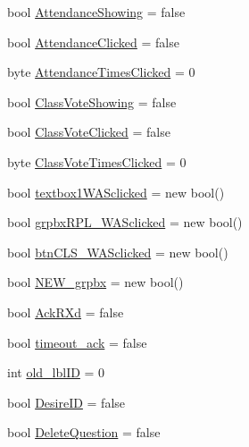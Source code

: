 \begin{DoxyCompactItemize}
\item 
bool \hyperlink{class_sr_p___classroom_inq_1_1frm_classrrom_inq_a24415681575df1fd435d1b1da60dfde3}{\-Attendance\-Showing} = false
\item 
bool \hyperlink{class_sr_p___classroom_inq_1_1frm_classrrom_inq_a319172bf9b9e58ec37499658a5289284}{\-Attendance\-Clicked} = false
\item 
byte \hyperlink{class_sr_p___classroom_inq_1_1frm_classrrom_inq_ade18c1a241b76944c2731681e1767652}{\-Attendance\-Times\-Clicked} = 0
\item 
bool \hyperlink{class_sr_p___classroom_inq_1_1frm_classrrom_inq_ae23aa3324c19688aa8d35b0217cf9605}{\-Class\-Vote\-Showing} = false
\item 
bool \hyperlink{class_sr_p___classroom_inq_1_1frm_classrrom_inq_a1e2c8341b4d2988c61648bea9a4c412b}{\-Class\-Vote\-Clicked} = false
\item 
byte \hyperlink{class_sr_p___classroom_inq_1_1frm_classrrom_inq_ab63c943c019363dba6aa86686b9f2bf6}{\-Class\-Vote\-Times\-Clicked} = 0
\item 
bool \hyperlink{class_sr_p___classroom_inq_1_1frm_classrrom_inq_a998e499144884577e3445f4b721b4c6a}{textbox1\-W\-A\-Sclicked} = new bool()
\item 
bool \hyperlink{class_sr_p___classroom_inq_1_1frm_classrrom_inq_a97ab9f8512cd6b2f9648651d5c5d404b}{grpbx\-R\-P\-L\-\_\-\-W\-A\-Sclicked} = new bool()
\item 
bool \hyperlink{class_sr_p___classroom_inq_1_1frm_classrrom_inq_aed9d1ad7c4e2b196997c1820ac2cdb4d}{btn\-C\-L\-S\-\_\-\-W\-A\-Sclicked} = new bool()
\item 
bool \hyperlink{class_sr_p___classroom_inq_1_1frm_classrrom_inq_aaf5a152b29ae06c11e8e25f0eabf454d}{\-N\-E\-W\-\_\-grpbx} = new bool()
\item 
bool \hyperlink{class_sr_p___classroom_inq_1_1frm_classrrom_inq_a65b6633a5bc7bff8142fcace6bfba3f8}{\-Ack\-R\-Xd} = false
\item 
bool \hyperlink{class_sr_p___classroom_inq_1_1frm_classrrom_inq_a64cde7d8ac96b5122de783724c58103a}{timeout\-\_\-ack} = false
\item 
int \hyperlink{class_sr_p___classroom_inq_1_1frm_classrrom_inq_ac56e0f039ce0113331d9bdd322b30827}{old\-\_\-lbl\-I\-D} = 0
\item 
bool \hyperlink{class_sr_p___classroom_inq_1_1frm_classrrom_inq_aad36cc9a93fb79969dd3b0d0fe52b793}{\-Desire\-I\-D} = false
\item 
bool \hyperlink{class_sr_p___classroom_inq_1_1frm_classrrom_inq_ab3a8803fac827da5757e7451c1836010}{\-Delete\-Question} = false

\end{DoxyCompactItemize}
